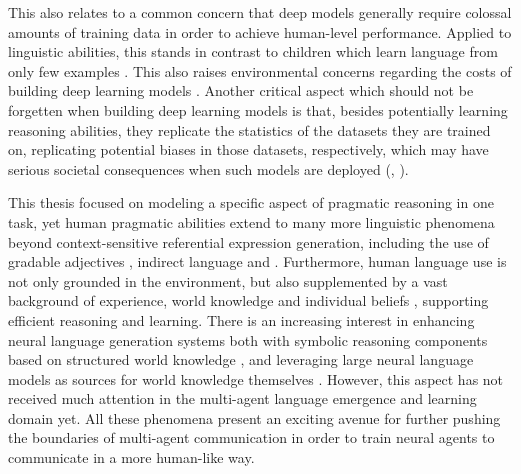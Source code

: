 This also relates to a common concern that deep models generally require colossal amounts of training data in order to achieve human-level performance. Applied to linguistic abilities, this stands in contrast to children which learn language from only few examples \parencite[e.~g.,][]{xu2007word}. This also raises environmental concerns regarding the costs of building deep learning models \parencite{bender2021dangers}.  
Another critical aspect which should not be forgetten when building deep learning models is that, besides potentially learning reasoning abilities, they replicate the statistics of the datasets they are trained on, replicating potential biases in those datasets, respectively, which may have serious societal consequences when such models are deployed (\cite{bender2021dangers}, \cite{buolamwini2018gender}). 

This thesis focused on modeling a specific aspect of pragmatic reasoning in one task, yet human pragmatic abilities extend to many more linguistic phenomena beyond context-sensitive referential expression generation, including the use of gradable adjectives \parencite{qing2014gradable}, indirect language \parencite{yoon2016talking} and .
Furthermore, human language use is not only grounded in the environment, but also supplemented by a vast background of experience, world knowledge and individual beliefs \parencite{lake2017building, franke2016does}, supporting efficient reasoning and learning. There is an increasing interest in enhancing neural language generation systems both with symbolic reasoning components based on structured world knowledge \parencite[e.~g.,][]{nye2021improving}, and leveraging large neural language models as sources for world knowledge themselves \parencite{petroni2019language}. However, this aspect has not received much attention in the multi-agent language emergence and learning domain yet. 
All these phenomena present an exciting avenue for further pushing the boundaries of multi-agent communication in order to train neural agents to communicate in a more human-like way. 

